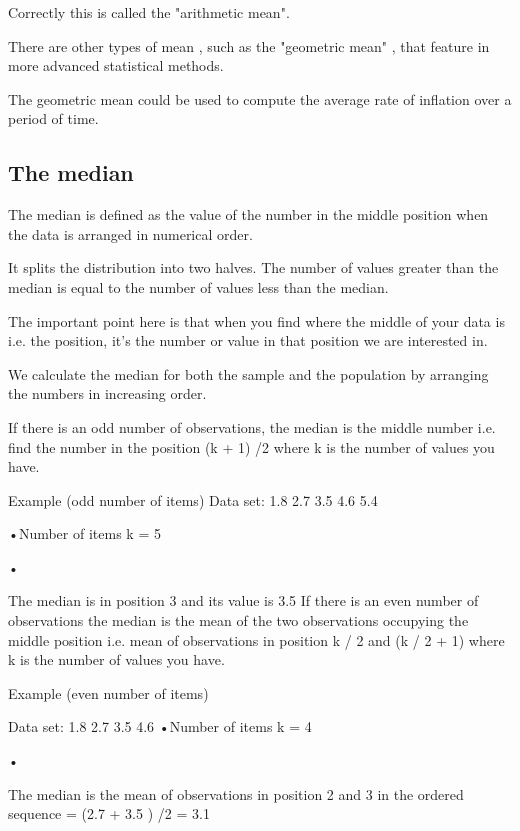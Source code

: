 \documentclass[]{report}
\begin{document}
Correctly this is called the "arithmetic mean". 
 
There are other types of mean , such as the "geometric mean" , that feature in more advanced statistical methods. 
 
The geometric mean could be used to compute the average rate of inflation over a period of time.

\subsection{The median}
 
The median is defined as the value of the number in the middle position when the data is arranged in numerical order.
 
It splits the distribution into two halves. The number of values greater than the median is equal to the number of values less than the median.

The important point here is that when you find where the middle of your data is i.e. the position, it’s the number or value in that position we are interested in.

We calculate the median for both the sample and the population by arranging the numbers in increasing order. 

If there is an odd number of observations, the median is the middle number i.e. find the number in the position (k + 1) /2 where k is the number of values you have.

Example (odd number of items)
Data set:    1.8   2.7   3.5   4.6   5.4

•Number of items k = 5       

• 


The median is in position 3 and its value  is 3.5
If there is an even number of observations the median is the mean of the two observations occupying the middle position i.e. mean of observations in position k / 2 and  (k / 2  + 1) where k is the number of values you have.

Example (even number of items)

Data set:    1.8   2.7   3.5   4.6   
•Number of items k = 4       

•  



The median is the mean of observations in position  2 and 3 in the ordered sequence  = (2.7 + 3.5 ) /2   = 3.1


 
\end{document}
